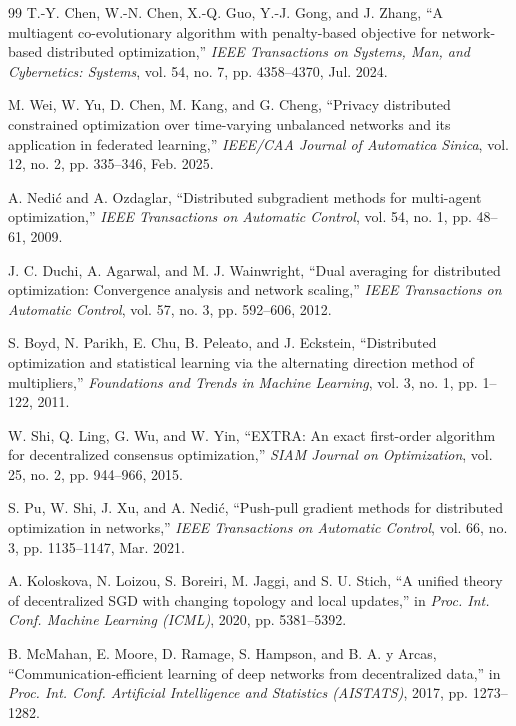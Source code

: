 \documentclass[conference]{IEEEtran}
\begin{document}
\begin{thebibliography}{99}
 T.-Y. Chen, W.-N. Chen, X.-Q. Guo, Y.-J. Gong, and J. Zhang, ``A multiagent co-evolutionary algorithm with penalty-based objective for network-based distributed optimization,'' \emph{IEEE Transactions on Systems, Man, and Cybernetics: Systems}, vol. 54, no. 7, pp. 4358--4370, Jul. 2024.

 M. Wei, W. Yu, D. Chen, M. Kang, and G. Cheng, ``Privacy distributed constrained optimization over time-varying unbalanced networks and its application in federated learning,'' \emph{IEEE/CAA Journal of Automatica Sinica}, vol. 12, no. 2, pp. 335--346, Feb. 2025.

 A. Nedi\'c and A. Ozdaglar, ``Distributed subgradient methods for multi-agent optimization,'' \emph{IEEE Transactions on Automatic Control}, vol. 54, no. 1, pp. 48--61, 2009.

 J. C. Duchi, A. Agarwal, and M. J. Wainwright, ``Dual averaging for distributed optimization: Convergence analysis and network scaling,'' \emph{IEEE Transactions on Automatic Control}, vol. 57, no. 3, pp. 592--606, 2012.

 S. Boyd, N. Parikh, E. Chu, B. Peleato, and J. Eckstein, ``Distributed optimization and statistical learning via the alternating direction method of multipliers,'' \emph{Foundations and Trends in Machine Learning}, vol. 3, no. 1, pp. 1--122, 2011.

 W. Shi, Q. Ling, G. Wu, and W. Yin, ``EXTRA: An exact first-order algorithm for decentralized consensus optimization,'' \emph{SIAM Journal on Optimization}, vol. 25, no. 2, pp. 944--966, 2015.

 S. Pu, W. Shi, J. Xu, and A. Nedi\'c, ``Push-pull gradient methods for distributed optimization in networks,'' \emph{IEEE Transactions on Automatic Control}, vol. 66, no. 3, pp. 1135--1147, Mar. 2021.

 A. Koloskova, N. Loizou, S. Boreiri, M. Jaggi, and S. U. Stich, ``A unified theory of decentralized SGD with changing topology and local updates,'' in \emph{Proc. Int. Conf. Machine Learning (ICML)}, 2020, pp. 5381--5392.

 B. McMahan, E. Moore, D. Ramage, S. Hampson, and B. A. y Arcas, ``Communication-efficient learning of deep networks from decentralized data,'' in \emph{Proc. Int. Conf. Artificial Intelligence and Statistics (AISTATS)}, 2017, pp. 1273--1282.


\end{thebibliography}
\end{document}
